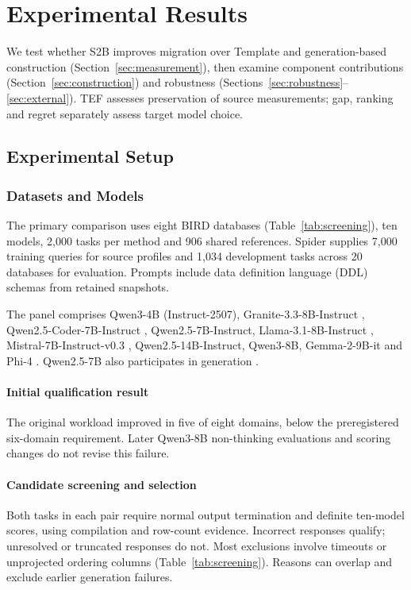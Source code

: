\section{Experimental Results}\label{sec:experiments}
We test whether S2B improves migration over Template and generation-based construction (Section~\ref{sec:measurement}), then examine component contributions (Section~\ref{sec:construction}) and robustness (Sections~\ref{sec:robustness}--\ref{sec:external}). TEF assesses preservation of source measurements; gap, ranking and regret separately assess target model choice.

\subsection{Experimental Setup}\label{sec:design}
\subsubsection{Datasets and Models}

The primary comparison uses eight BIRD databases (Table~\ref{tab:screening}), ten models, 2,000 tasks per method and 906 shared references. Spider supplies 7,000 training queries for source profiles and 1,034 development tasks across 20 databases for evaluation. Prompts include data definition language (DDL) schemas from retained snapshots.

The panel comprises Qwen3-4B (Instruct-2507), Granite-3.3-8B-Instruct \citep{ibm2025granite}, Qwen2.5-Coder-7B-Instruct \citep{hui2024qwencoder}, Qwen2.5-7B-Instruct, Llama-3.1-8B-Instruct \citep{grattafiori2024llama3}, Mistral-7B-Instruct-v0.3 \citep{jiang2023mistral,mistral2024instruct03}, Qwen2.5-14B-Instruct, Qwen3-8B, Gemma-2-9B-it \citep{gemma2024gemma2} and Phi-4 \citep{abdin2024phi4}. Qwen2.5-7B also participates in generation \citep{qwen2024qwen25}.

\paragraph{Initial qualification result}
The original workload improved in five of eight domains, below the preregistered six-domain requirement. Later Qwen3-8B non-thinking evaluations \citep{yang2025qwen3} and scoring changes do not revise this failure.

\paragraph{Candidate screening and selection}
Both tasks in each pair require normal output termination and definite ten-model scores, using compilation and row-count evidence. Incorrect responses qualify; unresolved or truncated responses do not. Most exclusions involve timeouts or unprojected ordering columns (Table~\ref{tab:screening}). Reasons can overlap and exclude earlier generation failures.

